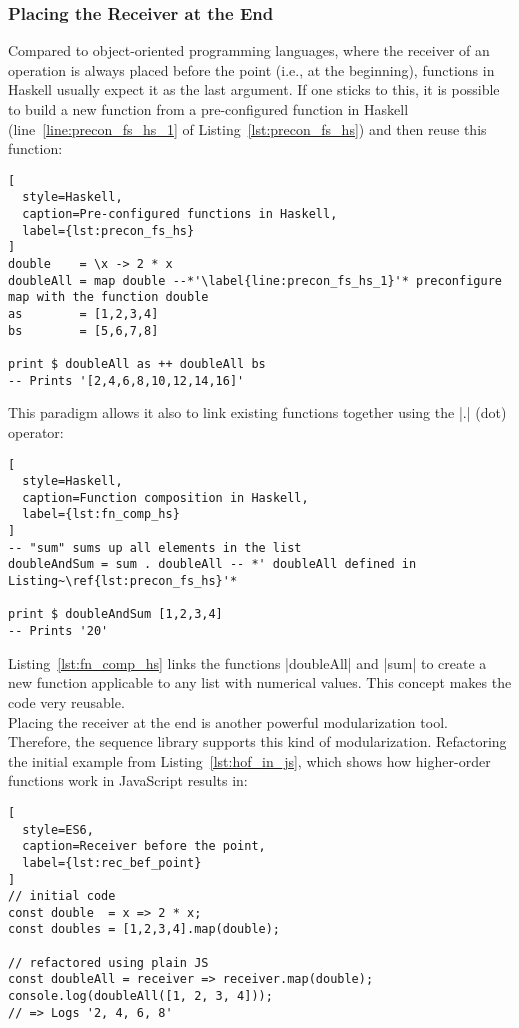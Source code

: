 \subsubsection{Placing the Receiver at the End} %
\label{subsub:Placing the Receiver at the End}
Compared to object-oriented programming languages, where the receiver of an
operation is always placed before the point (i.e., at the beginning), functions
in Haskell usually expect it as the last argument. If one sticks to this, it is
possible to build a new function from a pre-configured function in Haskell
(line~\ref{line:precon_fs_hs_1} of Listing~\ref{lst:precon_fs_hs}) and then
reuse this function:

\begin{lstlisting}[
  style=Haskell,
  caption=Pre-configured functions in Haskell,
  label={lst:precon_fs_hs}
]
double    = \x -> 2 * x
doubleAll = map double --*'\label{line:precon_fs_hs_1}'* preconfigure map with the function double
as        = [1,2,3,4]
bs        = [5,6,7,8]

print $ doubleAll as ++ doubleAll bs
-- Prints '[2,4,6,8,10,12,14,16]'
\end{lstlisting}

This paradigm allows it also to link existing functions together using the |.|
(dot) operator:

\begin{lstlisting}[
  style=Haskell,
  caption=Function composition in Haskell,
  label={lst:fn_comp_hs}
]
-- "sum" sums up all elements in the list
doubleAndSum = sum . doubleAll -- *' doubleAll defined in Listing~\ref{lst:precon_fs_hs}'*

print $ doubleAndSum [1,2,3,4]
-- Prints '20'
\end{lstlisting}

Listing~\ref{lst:fn_comp_hs} links the functions |doubleAll| and |sum| to
create a new function applicable to any list with numerical values. This
concept makes the code very reusable.\\
Placing the receiver at the end is another powerful modularization
tool. Therefore, the sequence library supports this kind of modularization.
Refactoring the initial example from Listing~\ref{lst:hof_in_js}, which 
shows how higher-order functions work in JavaScript results in:

\begin{lstlisting}[
  style=ES6,
  caption=Receiver before the point,
  label={lst:rec_bef_point}
]
// initial code
const double  = x => 2 * x;
const doubles = [1,2,3,4].map(double);

// refactored using plain JS
const doubleAll = receiver => receiver.map(double);
console.log(doubleAll([1, 2, 3, 4]));
// => Logs '2, 4, 6, 8'
\end{lstlisting}

